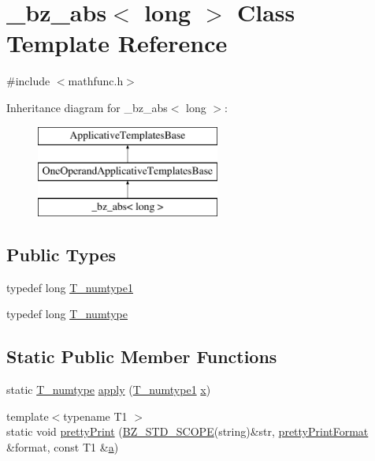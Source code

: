 \hypertarget{class__bz__abs_3_01long_01_4}{}\section{\+\_\+bz\+\_\+abs$<$ long $>$ Class Template Reference}
\label{class__bz__abs_3_01long_01_4}


{\ttfamily \#include $<$mathfunc.\+h$>$}

Inheritance diagram for \+\_\+bz\+\_\+abs$<$ long $>$\+:\begin{figure}[H]
\begin{center}
\leavevmode
\includegraphics[height=3.000000cm]{class__bz__abs_3_01long_01_4}
\end{center}
\end{figure}
\subsection*{Public Types}
\begin{DoxyCompactItemize}
\item 
typedef long \hyperlink{class__bz__abs_3_01long_01_4_a76538408b8785799c8d4c5a4fea14819}{T\+\_\+numtype1}
\item 
typedef long \hyperlink{class__bz__abs_3_01long_01_4_a67b0d255db158f736d0676e073b34b90}{T\+\_\+numtype}
\end{DoxyCompactItemize}
\subsection*{Static Public Member Functions}
\begin{DoxyCompactItemize}
\item 
static \hyperlink{class__bz__abs_3_01long_01_4_a67b0d255db158f736d0676e073b34b90}{T\+\_\+numtype} \hyperlink{class__bz__abs_3_01long_01_4_adb17ed879d9fe4c9e12c0c27cfe0c716}{apply} (\hyperlink{class__bz__abs_3_01long_01_4_a76538408b8785799c8d4c5a4fea14819}{T\+\_\+numtype1} \hyperlink{vecnorm1_8cc_ac73eed9e41ec09d58f112f06c2d6cb63}{x})
\item 
{\footnotesize template$<$typename T1 $>$ }\\static void \hyperlink{class__bz__abs_3_01long_01_4_a8dfb78c9182f8a6616edcb64f1cd51ed}{pretty\+Print} (\hyperlink{numinquire_8h_a2b24ffc3b4ef9803956bc7715c6c7b83}{B\+Z\+\_\+\+S\+T\+D\+\_\+\+S\+C\+O\+P\+E}(string)\&str, \hyperlink{classprettyPrintFormat}{pretty\+Print\+Format} \&format, const T1 \&\hyperlink{gen__mat5files_8m_aae328bf20413f220e38aec4d95bfd6da}{a})
\end{DoxyCompactItemize}


